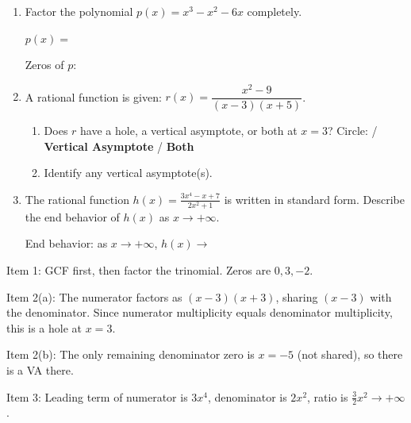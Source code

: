 \documentclass[10pt]{article}
\begin{document}
\namedateperiod

\vspace{0.12in}

\begin{enumerate}[itemsep=14pt]

\item Factor the polynomial $p(x) = x^3 - x^2 - 6x$ completely.

      \vspace{0.08in}
      $p(x) = $ 

      Zeros of $p$: 

\item A rational function is given: $\displaystyle r(x) = \dfrac{x^2 - 9}{(x-3)(x+5)}$.

      \begin{enumerate}[label=(\alph*), itemsep=6pt]
        \item Does $r$ have a hole, a vertical asymptote, or both at $x = 3$?
              Circle: \quad {} \quad / \quad \textbf{Vertical Asymptote} \quad / \quad \textbf{Both}

        \item Identify any vertical asymptote(s). 
      \end{enumerate}

\item The rational function $\displaystyle h(x) = \frac{3x^4 - x + 7}{2x^2 + 1}$ is written in
      standard form. Describe the end behavior of $h(x)$ as $x \to +\infty$.

      \vspace{0.06in}
      End behavior: as $x \to +\infty$, $h(x) \to$ \ans{$+\infty$}

\end{enumerate}

\begin{teachernote}
Item 1: GCF first, then factor the trinomial. Zeros are $0, 3, -2$.

Item 2(a): The numerator factors as $(x-3)(x+3)$, sharing $(x-3)$ with the denominator. Since numerator multiplicity equals denominator multiplicity, this is a hole at $x=3$.

Item 2(b): The only remaining denominator zero is $x = -5$ (not shared), so there is a VA there.

Item 3: Leading term of numerator is $3x^4$, denominator is $2x^2$, ratio is $\frac{3}{2}x^2 \to +\infty$.
\end{teachernote}
\end{document}
